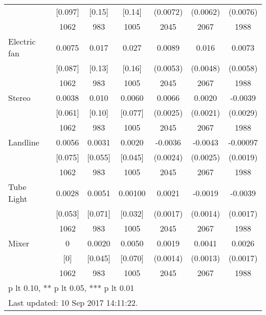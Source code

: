 \begin{table}[htbp]
\begin{tabular*}{1\hsize}{@{\hskip\tabcolsep\extracolsep\fill}l*{1}{cccccc}}
                                &  [0.097]&   [0.15]&   [0.14]& (0.0072)         & (0.0062)         & (0.0076)         \\
                                &     1062&      983&     1005&     2045         &     2067         &     1988         \\
Electric fan                    &   0.0075&    0.017&    0.027&   0.0089\sym{*}  &    0.016\sym{***}&   0.0073         \\
                                &  [0.087]&   [0.13]&   [0.16]& (0.0053)         & (0.0048)         & (0.0058)         \\
                                &     1062&      983&     1005&     2045         &     2067         &     1988         \\
Stereo                          &   0.0038&    0.010&   0.0060&   0.0066\sym{***}&   0.0020         &  -0.0039         \\
                                &  [0.061]&   [0.10]&  [0.077]& (0.0025)         & (0.0021)         & (0.0029)         \\
                                &     1062&      983&     1005&     2045         &     2067         &     1988         \\
Landline                        &   0.0056&   0.0031&   0.0020&  -0.0036         &  -0.0043\sym{*}  & -0.00097         \\
                                &  [0.075]&  [0.055]&  [0.045]& (0.0024)         & (0.0025)         & (0.0019)         \\
                                &     1062&      983&     1005&     2045         &     2067         &     1988         \\
Tube Light                      &   0.0028&   0.0051&  0.00100&   0.0021         &  -0.0019         &  -0.0039\sym{**} \\
                                &  [0.053]&  [0.071]&  [0.032]& (0.0017)         & (0.0014)         & (0.0017)         \\
                                &     1062&      983&     1005&     2045         &     2067         &     1988         \\
Mixer                           &        0&   0.0020&   0.0050&   0.0019         &   0.0041\sym{***}&   0.0026         \\
                                &      [0]&  [0.045]&  [0.070]& (0.0014)         & (0.0013)         & (0.0017)         \\
                                &     1062&      983&     1005&     2045         &     2067         &     1988         \\
\bottomrule
\multicolumn{7}{l}{\footnotesize * p lt 0.10, ** p lt 0.05, *** p lt 0.01}\\
\multicolumn{7}{l}{\footnotesize Last updated: 10 Sep 2017 14:11:22.}\\
\end{tabular*}
\end{table}
